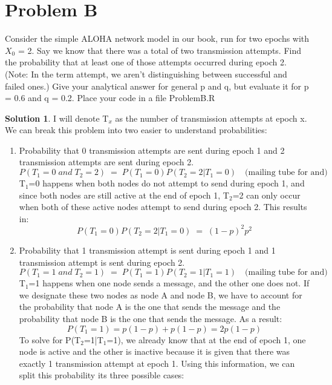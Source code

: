 \documentclass[paper=a4, fontsize=11pt]{scrartcl} %
\numberwithin{equation}{section} %
\numberwithin{figure}{section} %
\numberwithin{table}{section} %
\theoremstyle{definition}
\newtheorem*{solution}{Solution}
\begin{document}
\section{Problem B}
    Consider the simple ALOHA network model in our book, run for two epochs with $X{_0}$ = 2. Say we know that there was a total of two transmission attempts. Find the probability that at least one of those attempts occurred during epoch 2. (Note: In the term attempt, we aren't distinguishing between successful and failed ones.) Give your analytical answer for general p and q, but evaluate it for p = 0.6 and q = 0.2. Place your code in a file ProblemB.R
    \begin{solution} 
        I will denote T${_x}$ as the number of transmission attempts at epoch x. We can break this problem into two easier to understand probabilities: 
        \begin{enumerate}
            \item Probability that 0 transmission attempts are sent during epoch 1 and 2 transmission attempts are sent during epoch 2.
            $$P(T_{1}=0 \; and \; T_{2}=2) \; = \; P(T_{1}=0)P(T_{2}=2|T_{1}=0) \quad \text{(mailing tube for and)} $$ 
            T${_1}$=0 happens when both nodes do not attempt to send during epoch 1, and since both nodes are still active at the end of epoch 1, T${_2}$=2 can only occur when both of these active nodes attempt to send during epoch 2. This results in:
            \begin{equation}
                P(T_{1}=0)P(T_{2}=2|T_{1}=0) \; = \; (1-p)^2p^2
            \end{equation}
            \item Probability that 1 transmission attempt is sent during epoch 1 and 1 transmission attempt is sent during epoch 2.
            $$P(T_{1}=1 \; and \; T_{2}=1) \; = \; P(T_{1}=1)P(T_{2}=1|T_{1}=1) \quad \text{(mailing tube for and)} $$
            T${_1}$=1 happens when one node sends a message, and the other one does not. If we designate these two nodes as node A and node B, we have to account for the probability that node A is the one that sends the message and the probability that node B is the one that sends the message. As a result:
            \begin{equation}
                P(T_{1}=1)=p(1-p) + p(1-p) = 2p(1-p)
            \end{equation}
            To solve for P(T${_2}$=1|T${_1}$=1), we already know that at the end of epoch 1, one node is active and the other is inactive because it is given that there was exactly 1 transmission attempt at epoch 1. Using this information, we can split this probability its three possible cases:

\end{enumerate}
\end{solution}
\end{document}
